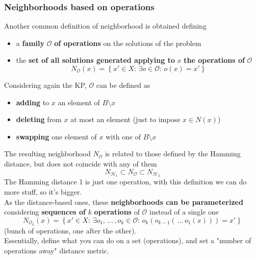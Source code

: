 \newpage

\subsubsection{Neighborhoods based on operations}

Another common definition of neighborhood is obtained defining
\begin{itemize}
	\item a \textbf{family} $\mathcal{O}$ \textbf{of operations} on the solutions of the problem
	
	\item the \textbf{set of all solutions generated applying to} $x$ \textbf{the operations of} $\mathcal{O}$
	$$ N_{\mathcal{O}} (x) = \left\{x' \in X : \, \exists o \in \mathcal{O}: \, o (x) = x' \right\} $$
\end{itemize}

Considering again the KP, $\mathcal{O}$ can be defined as
\begin{itemize}
	\item \textbf{adding} to $x$ an element of $B \setminus x$
	
	\item \textbf{deleting} from $x$ at most an element (just to impose $x \in N (x)$)
	
	\item \textbf{swapping} one element of $x$ with one of $B \setminus x$
\end{itemize}

The resulting neighborhood $N_{\mathcal{O}}$ is related to those defined by the Hamming distance, but does not coincide with any of them
$$ N_{\mathcal{H}_1} \subset N_{\mathcal{O}} \subset N_{\mathcal{H}_2} $$
The Hamming distance 1 is just one operation, with this definition we can do more stuff, so it's bigger.\\

As the distance-based ones, these \textbf{neighborhoods can be parameterized} considering \textbf{sequences of} $k$ \textbf{operations} of $\mathcal{O}$ instead of a single one
$$ N_{\mathcal{O}_k} (x) = \left\{ x' \in X : \, \exists o_1, \, ... \, , o_k \in \mathcal{O} : \, o_k (o_{k-1} ( \, ... \, o_1 (x))) = x' \right\} $$ 
(bunch of operations, one after the other).\\

Essentially, define what you can do on a set (operations), and set a "number of operations away" distance metric.\\	


